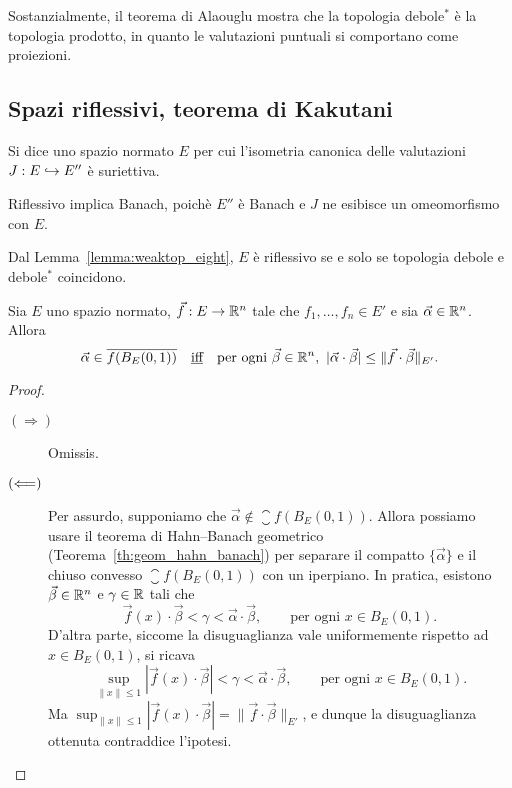 \begin{remark}
	Sostanzialmente, il teorema di Alaouglu mostra che la topologia debole$^*$ è la topologia prodotto, in quanto le valutazioni puntuali si comportano come proiezioni.
\end{remark}

\subsection{Spazi riflessivi, teorema di Kakutani}
\begin{definition}
	Si dice  uno spazio normato $E$ per cui l'isometria canonica delle valutazioni $J : E \hookrightarrow E''$ è suriettiva.
\end{definition}

\begin{remark}
	Riflessivo implica Banach, poichè $E''$ è Banach e $J$ ne esibisce un omeomorfismo con $E$.
\end{remark}
\begin{remark}
	Dal Lemma~\ref{lemma:weaktop_eight}, $E$ è riflessivo se e solo se topologia debole e debole$^*$ coincidono.
\end{remark}

\begin{lemma}[Helly]
	Sia $E$ uno spazio normato, $\vec f : E \to \mathbb{R}^n$ tale che $f_1, \ldots, f_n \in E'$ e sia $\vec \alpha \in \mathbb{R}^n$.
	Allora
	\begin{equation*}
		\vec \alpha \in \overline{f(B_E(0,1))} \quad\text{\underline{iff}}\quad \text{per ogni $\vec \beta \in \mathbb{R}^n$},\ |\vec\alpha \cdot \vec\beta| \leq \|\vec f \cdot \vec \beta\|_{E'}.
	\end{equation*}
\end{lemma}
\begin{proof}
	\leavevmode
	\begin{description}
		\item[$(\Longrightarrow)$] Omissis.
		\item[$(\Longleftarrow)$] Per assurdo, supponiamo che $\vec \alpha \notin \closure{f(B_E(0,1))}$. Allora possiamo usare il teorema di Hahn--Banach geometrico (Teorema~\ref{th:geom_hahn_banach}) per separare il compatto $\{\vec\alpha\}$ e il chiuso convesso $\closure{f(B_E(0,1))}$ con un iperpiano. In pratica, esistono $\vec\beta \in \mathbb{R}^n$ e $\gamma \in \mathbb{R}$ tali che
		\begin{equation*}
			\vec f(x) \cdot \vec \beta < \gamma < \vec \alpha \cdot \vec \beta, \qquad \text{per ogni $x \in B_E(0,1)$}.
		\end{equation*}
		D'altra parte, siccome la disuguaglianza vale uniformemente rispetto ad $x \in B_E(0,1)$, si ricava
		\begin{equation*}
			\sup_{\|x\| \leq 1} |\vec f(x) \cdot \vec \beta| < \gamma < \vec \alpha \cdot \vec \beta, \qquad \text{per ogni $x \in B_E(0,1)$}.
		\end{equation*}
		Ma $\sup_{\|x\| \leq 1} |\vec f(x) \cdot \vec \beta| = \|\vec f \cdot \vec \beta\|_{E'}$, e dunque la disuguaglianza ottenuta contraddice l'ipotesi.
	\end{description}
\end{proof}

